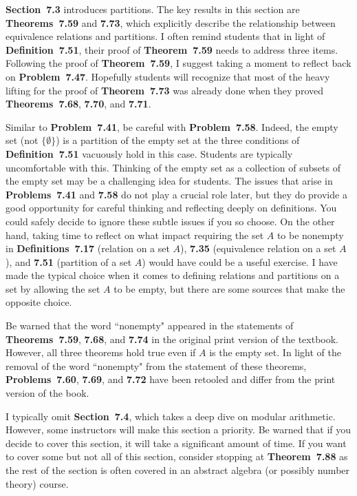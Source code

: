 \documentclass[11pt]{article}%
\newcommand{\blankline}{\pagebreak[2]\vspace{.5\baselineskip}}
\begin{document}
\blankline

\textbf{Section~7.3} introduces partitions.  The key results in this section are \textbf{Theorems~7.59} and \textbf{7.73}, which explicitly describe the relationship between equivalence relations and partitions.  I often remind students that in light of \textbf{Definition~7.51}, their proof of \textbf{Theorem~7.59} needs to address three items. Following the proof of \textbf{Theorem~7.59}, I suggest taking a moment to reflect back on \textbf{Problem~7.47}. Hopefully students will recognize that most of the heavy lifting for the proof of \textbf{Theorem~7.73} was already done when they proved \textbf{Theorems~7.68}, \textbf{7.70}, and \textbf{7.71}.

\blankline

Similar to \textbf{Problem~7.41}, be careful with \textbf{Problem~7.58}. Indeed, the empty set (not $\{\emptyset\}$) is a partition of the empty set at the three conditions of \textbf{Definition~7.51} vacuously hold in this case.  Students are typically uncomfortable with this. Thinking of the empty set as a collection of subsets of the empty set may be a challenging idea for students.  The issues that arise in \textbf{Problems~7.41} and \textbf{7.58} do not play a crucial role later, but they do provide a good opportunity for careful thinking and reflecting deeply on definitions.  You could safely decide to ignore these subtle issues if you so choose.  On the other hand, taking time to reflect on what impact requiring the set $A$ to be nonempty in \textbf{Definitions~7.17} (relation on a set $A$), \textbf{7.35} (equivalence relation on a set $A$), and \textbf{7.51} (partition of a set $A$) would have could be a useful exercise.  I have made the typical choice when it comes to defining relations and partitions on a set by allowing the set $A$ to be empty, but there are some sources that make the opposite choice.

\blankline

Be warned that the word ``nonempty" appeared in the statements of \textbf{Theorems~7.59}, \textbf{7.68}, and \textbf{7.74} in the original print version of the textbook.  However, all three theorems hold true even if $A$ is the empty set.  In light of the removal of the word ``nonempty" from the statement of these theorems, \textbf{Problems~7.60}, \textbf{7.69}, and \textbf{7.72} have been retooled and differ from the print version of the book.

\blankline

I typically omit \textbf{Section~7.4}, which takes a deep dive on modular arithmetic.  However, some instructors will make this section a priority.  Be warned that if you decide to cover this section, it will take a significant amount of time.  If you want to cover some but not all of this section, consider stopping at \textbf{Theorem~7.88} as the rest of the section is often covered in an abstract algebra (or possibly number theory) course.
\end{document}
